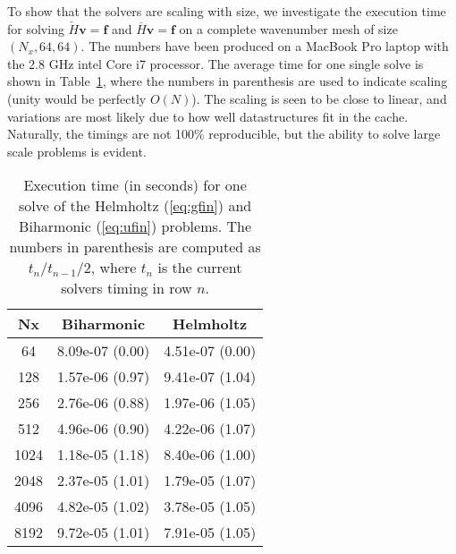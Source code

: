 \documentclass[11pt, oneside]{article}
\newcommand{\N}[1]{\check{#1}}
\newcommand{\D}[1]{\overline{#1}}
\begin{document}
To show that the solvers are scaling with size, we investigate the execution time 
for solving $\N{H} \bm{v} = \bm{f}$ and $\D{H} \bm{v} = \bm{f}$ on a complete 
wavenumber mesh of size $(N_x,64,64)$. The numbers have been produced on a MacBook Pro laptop with the 2.8 GHz intel Core i7 processor. The average time for one single 
solve is shown in Table~\ref{tab:timings}, where the numbers in parenthesis are used to indicate scaling (unity would be perfectly $O(N)$). The scaling is seen to be close to linear, and variations 
are most likely due to how well datastructures fit in the cache. Naturally, the timings are not 100$\%$ reproducible, but the ability to solve large scale problems is evident.
\begin{table}
	\centering
	\caption{Execution time (in seconds) for one solve  of the Helmholtz 
	(\ref{eq:gfin}) and Biharmonic 
	(\ref{eq:ufin}) problems. The numbers in parenthesis are computed as $t_n / t_{n-1} / 2$, where $t_n$ is the current solvers timing in row $n$.}
	\label{tab:timings}
	\begin{tabular}{ccc}
Nx & Biharmonic & Helmholtz \\ 
\hline
64 & 8.09e-07 (0.00) & 4.51e-07 (0.00) \\ 
128 & 1.57e-06 (0.97) & 9.41e-07 (1.04) \\ 
256 & 2.76e-06 (0.88) & 1.97e-06 (1.05) \\ 
512 & 4.96e-06 (0.90) & 4.22e-06 (1.07) \\ 
1024 & 1.18e-05 (1.18) & 8.40e-06 (1.00) \\ 
2048 & 2.37e-05 (1.01) & 1.79e-05 (1.07) \\ 
4096 & 4.82e-05 (1.02) & 3.78e-05 (1.05) \\ 
8192 & 9.72e-05 (1.01) & 7.91e-05 (1.05)
	\end{tabular}
\end{table}
\end{document}
